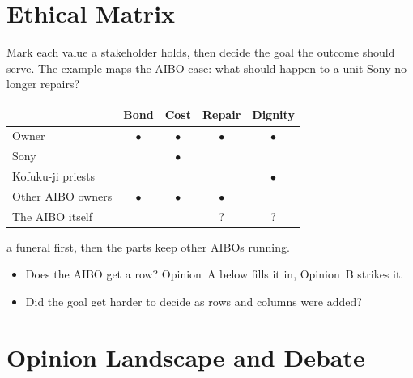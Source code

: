 \newpage
\section*{Ethical Matrix}


 Mark each value a
stakeholder holds, then decide the goal the outcome should serve. The example
maps the AIBO case: what should happen to a unit Sony no longer repairs?

\bigskip
\noindent\begin{tabular}{@{}lcccc@{}}
    \toprule
                      & Bond      & Cost      & Repair    & Dignity   \\
    \midrule
    Owner             & $\bullet$ & $\bullet$ & $\bullet$ & $\bullet$ \\
    Sony              &           & $\bullet$ &           &           \\
    Kofuku-ji priests &           &           &           & $\bullet$ \\
    Other AIBO owners & $\bullet$ & $\bullet$ & $\bullet$ &           \\
    The AIBO itself   &           &           & ?         & ?         \\
    \bottomrule
\end{tabular}

\bigskip
{} a funeral first, then the parts keep other
AIBOs running.

\begin{itemize}
    \item Does the AIBO get a row? Opinion~A below fills it in, Opinion~B
    strikes it.
    \item Did the goal get harder to decide as rows and columns were added?
\end{itemize}


\newpage
\section*{Opinion Landscape and Debate}

